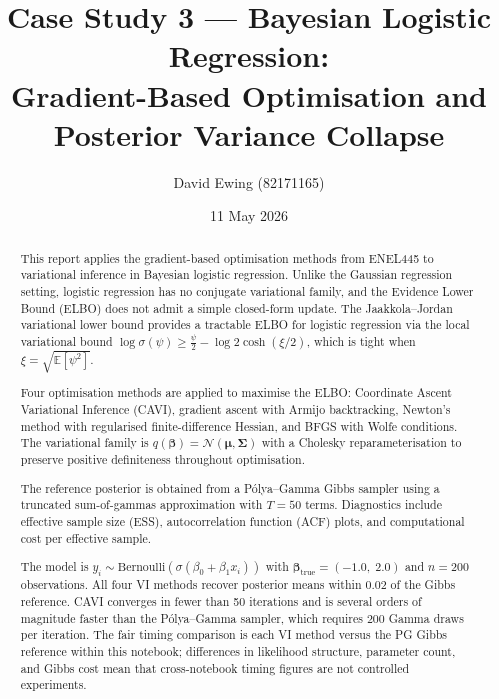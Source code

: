 \documentclass[11pt,a4paper]{article}
\title{
Case Study 3 --- Bayesian Logistic Regression:\\[0.4em]
Gradient-Based Optimisation and Posterior Variance Collapse
}
\author{
  David Ewing (82171165)
}
\date{11 May 2026}
\newcommand{\E}{\mathbb{E}}
\newcommand{\N}{\mathcal{N}}
\begin{document}
\maketitle

\begin{abstract}
\setlength{\parindent}{0pt}
\setlength{\parskip}{0.7em}

This report applies the gradient-based optimisation methods from ENEL445 to variational
inference in Bayesian logistic regression.
Unlike the Gaussian regression setting, logistic regression has no conjugate variational
family, and the Evidence Lower Bound (ELBO) does not admit a simple closed-form update.
The Jaakkola--Jordan \parencite{Jaakkola2000} variational lower bound provides a tractable
ELBO for logistic regression via the local variational bound $\log\sigma(\psi) \geq
\tfrac{\psi}{2} - \log 2\cosh(\xi/2)$, which is tight when $\xi = \sqrt{\E[\psi^2]}$.

Four optimisation methods are applied to maximise the ELBO:
Coordinate Ascent Variational Inference (CAVI), gradient ascent with Armijo backtracking,
Newton's method with regularised finite-difference Hessian, and BFGS with Wolfe conditions.
The variational family is $q(\bm{\beta}) = \N(\bm{\mu},\bm{\Sigma})$ with a
Cholesky reparameterisation to preserve positive definiteness throughout optimisation.

The reference posterior is obtained from a P\'{o}lya--Gamma Gibbs sampler
\parencite{Polson2013} using a truncated sum-of-gammas approximation with $T=50$ terms.
Diagnostics include effective sample size (ESS), autocorrelation function (ACF) plots,
and computational cost per effective sample.

The model is $y_i \sim \mathrm{Bernoulli}(\sigma(\beta_0 + \beta_1 x_i))$
with $\bm{\beta}_{\mathrm{true}} = (-1.0,\; 2.0)$ and $n=200$ observations.
All four VI methods recover posterior means within $0.02$ of the Gibbs reference.
CAVI converges in fewer than 50 iterations and is several orders of magnitude faster
than the P\'{o}lya--Gamma sampler, which requires $200$ Gamma draws per iteration.
The fair timing comparison is each VI method versus the PG Gibbs reference within
this notebook; differences in likelihood structure, parameter count, and Gibbs cost
mean that cross-notebook timing figures are not controlled experiments.
\end{abstract}

\newpage

\end{document}
